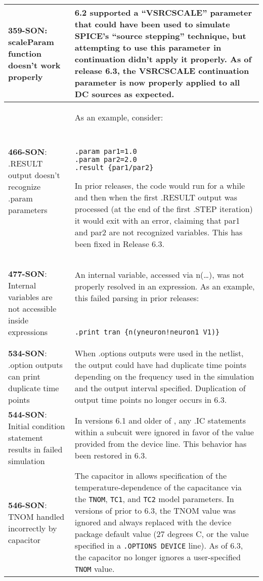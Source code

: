 \begin{longtable}[h] {>{\raggedright\small}m{2in}|>{\raggedright\let\\\tabularnewline\small}m{3.5in}}
\textbf{359-SON}: scaleParam function doesn't work properly &   \Xyce{} 6.2 supported a ``VSRCSCALE'' parameter that could have been used to simulate SPICE's ``source stepping'' technique, but attempting to use this parameter in continuation didn't apply it properly.  As of release 6.3, the VSRCSCALE continuation parameter is now properly applied to all DC sources as expected.
\\ \hline 

\textbf{466-SON}: .RESULT output doesn't recognize .param parameters &  As an
example, consider: 
{\tt
\begin{verbatim}
.param par1=1.0 
.param par2=2.0 
.result {par1/par2} 
\end{verbatim}
}
In prior releases, the code would run for a while and then when the first .RESULT output was
processed (at the end of the first .STEP iteration) it would exit with an error,
claiming that par1 and par2 are not recognized variables.  This has been fixed in Release 6.3.
\\ \hline

\textbf{477-SON}: Internal variables are not accessible inside expressions &
An internal variable, accessed via n(…), was not properly resolved in an
expression. As an example, this failed parsing in prior releases: 
{\tt
\begin{verbatim}
.print tran {n(yneuron!neuron1_V1)} 
\end{verbatim}
}
\\ \hline

\textbf{534-SON}: .option outputs can print duplicate time points & When .options outputs were used in the netlist, the output could have had duplicate time points depending on the frequency used in the simulation and the output interval specified.  Duplication of output  time points no longer occurs in \Xyce{} 6.3.
\\ \hline

\textbf{544-SON}: Initial condition statement results in failed
simulation & In versions 6.1 and older of \Xyce{}, any .IC statements within a
subcuit were ignored in favor of the value provided from the device
line.  This behavior has been restored in \Xyce{} 6.3. \\ \hline

\textbf{546-SON}: TNOM handled incorrectly by capacitor & The capacitor in \Xyce{} allows specification of the temperature-dependence of the capacitance via the \texttt{TNOM}, \texttt{TC1}, and \texttt{TC2} model parameters.  In versions of \Xyce{} prior to 6.3, the TNOM value was ignored and always replaced with the device package default value (27 degrees C, or the value specified in a \texttt{.OPTIONS DEVICE} line).  As of \Xyce{} 6.3, the capacitor no longer ignores a user-specified \texttt{TNOM} value.
\\ \hline 


\end{longtable}
